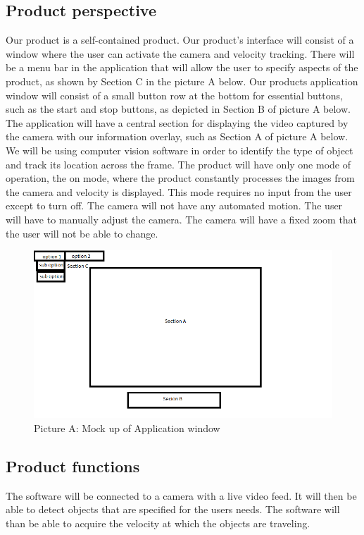 \documentclass[letterpaper,10pt,onecolumn,draftclsnofoot]{IEEEtran}
\begin{document}
\subsection{Product perspective}
Our product is a self-contained product. 
Our product's interface will consist of a window where the user can activate the camera and velocity tracking.
There will be a menu bar in the application that will allow the user to specify aspects of the product, as shown by Section C in the picture A below.
Our products application window will consist of a small button row at the bottom for essential buttons, such as the start and stop buttons, as depicted in Section B of picture A below.
The application will have a central section for displaying the video captured by the camera with our information overlay, such as Section A of picture A below.
We will be using computer vision software in order to identify the type of object and track its location across the frame.
The product will have only one mode of operation, the on mode, where the product constantly processes the images from the camera and velocity is displayed.
This mode requires no input from the user except to turn off.
The camera will not have any automated motion.
The user will have to manually adjust the camera.
The camera will have a fixed zoom that the user will not be able to change.

\begin{figure}[h]
    \centering
    \includegraphics[scale=0.75]{cs_461_mock_up}
    \caption{Picture A: Mock up of Application window}
    \label{fig: pic_a}
\end{figure}


\subsection{Product functions}
The software will be connected to a camera with a live video feed.
It will then be able to detect objects that are specified for the users needs.
The software will than be able to acquire the velocity at which the objects are traveling.
\end{document}
